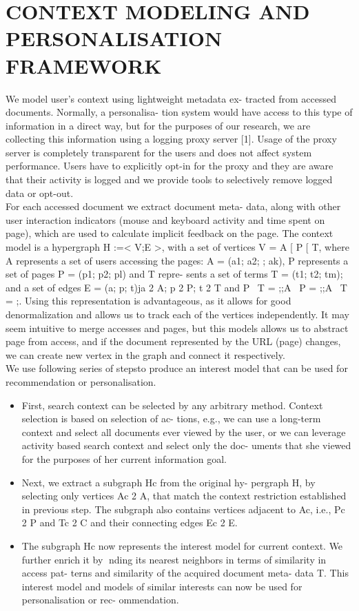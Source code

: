 \documentclass{acm_proc_article-sp} %
\begin{document}
\section{CONTEXT MODELING AND PERSONALISATION
	FRAMEWORK}
We model user's context using lightweight metadata ex-
tracted from accessed documents. Normally, a personalisa-
tion system would have access to this type of information
in a direct way, but for the purposes of our research, we are
collecting this information using a logging proxy server [1].
Usage of the proxy server is completely transparent for the
users and does not affect system performance. Users have to
explicitly opt-in for the proxy and they are aware that their
activity is logged and we provide tools to selectively remove
logged data or opt-out.
\\
For each accessed document we extract document meta-
data, along with other user interaction indicators (mouse
and keyboard activity and time spent on page), which are
used to calculate implicit feedback on the page.
The context model is a hypergraph H :=< V;E >, with
a set of vertices V = A [ P [ T, where A represents a
set of users accessing the pages: A = (a1; a2;  ; ak), P
represents a set of pages P = (p1; p2; pl) and T repre-
sents a set of terms T = (t1; t2; tm); and a set of edges
E = (a; p; t)ja 2 A; p 2 P; t 2 T and P \ T = ;;A \ P =
;;A \ T = ;. Using this representation is advantageous, as
it allows for good denormalization and allows us to track
each of the vertices independently. It may seem intuitive
to merge accesses and pages, but this models allows us to
abstract page from access, and if the document represented
by the URL (page) changes, we can create new vertex in the
graph and connect it respectively.
\\
We use following series of stepsto produce an interest
model that can be used for recommendation or personalisation.
\begin{itemize}
 \item
 First, search context can be selected by any arbitrary
 method. Context selection is based on selection of ac-
 tions, e.g., we can use a long-term context and select all
 documents ever viewed by the user, or we can leverage
 activity based search context and select only the doc-
 uments that she viewed for the purposes of her current
 information goal.
 \item
 Next, we extract a subgraph Hc from the original hy-
 pergraph H, by selecting only vertices Ac 2 A, that
 match the context restriction established in previous
 step. The subgraph also contains vertices adjacent to
 Ac, i.e., Pc 2 P and Tc 2 C and their connecting edges
 Ec 2 E.
 \item
 The subgraph Hc now represents the interest model
 for current context. We further enrich it by nding its
 nearest neighbors in terms of similarity in access pat-
 terns and similarity of the acquired document meta-
 data T. This interest model and models of similar
 interests can now be used for personalisation or rec-
 ommendation.
	
\end{itemize} 	
\end{document}
